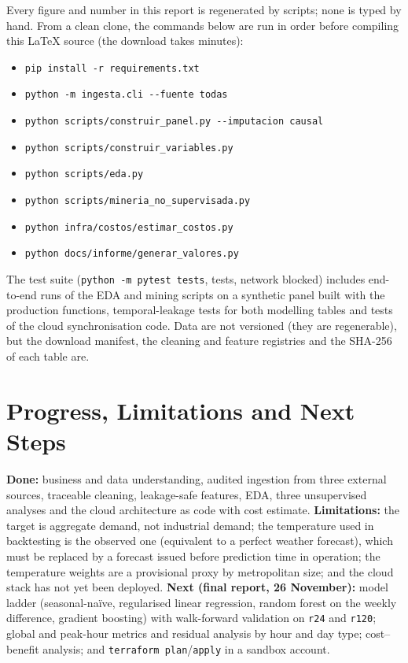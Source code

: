 \documentclass[conference,10pt]{IEEEtran}
\begin{document}
Every figure and number in this report is regenerated by scripts; none is typed by hand. From a clean clone, the commands below are run in order before compiling this \LaTeX{} source (the download takes minutes):\par
{\footnotesize
\begin{itemize}\setlength{\itemsep}{0pt}\setlength{\parskip}{0pt}
\item \texttt{pip install -r requirements.txt}
\item \texttt{python -m ingesta.cli -{}-fuente todas}
\item \texttt{python scripts/construir\_panel.py -{}-imputacion causal}
\item \texttt{python scripts/construir\_variables.py}
\item \texttt{python scripts/eda.py}
\item \texttt{python scripts/mineria\_no\_supervisada.py}
\item \texttt{python infra/costos/estimar\_costos.py}
\item \texttt{python docs/informe/generar\_valores.py}
\end{itemize}}
\noindent The test suite (\texttt{python -m pytest tests}, \nPruebas{} tests, network blocked) includes end-to-end runs of the EDA and mining scripts on a synthetic panel built with the production functions, temporal-leakage tests for both modelling tables and tests of the cloud synchronisation code. Data are not versioned (they are regenerable), but the download manifest, the cleaning and feature registries and the SHA-256 of each table are.

\section{Progress, Limitations and Next Steps}
\textbf{Done:} business and data understanding, audited ingestion from three external sources, traceable cleaning, leakage-safe features, EDA, three unsupervised analyses and the cloud architecture as code with cost estimate.
\textbf{Limitations:} the target is aggregate demand, not industrial demand; the temperature used in backtesting is the observed one (equivalent to a perfect weather forecast), which must be replaced by a forecast issued before prediction time in operation; the temperature weights are a provisional proxy by metropolitan size; and the cloud stack has not yet been deployed.
\textbf{Next (final report, 26 November):} model ladder (seasonal-naïve, regularised linear regression, random forest on the weekly difference, gradient boosting) with walk-forward validation on \texttt{r24} and \texttt{r120}; global and peak-hour metrics and residual analysis by hour and day type; cost--benefit analysis; and \texttt{terraform plan}/\texttt{apply} in a sandbox account.
\end{document}
